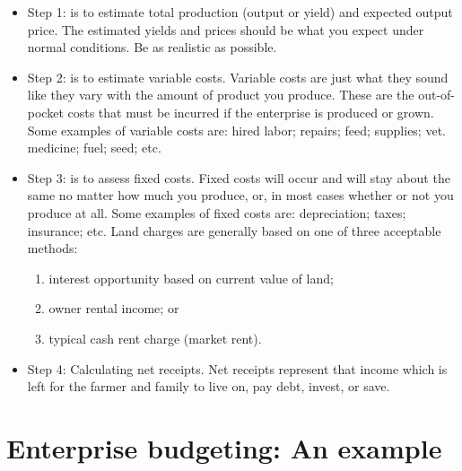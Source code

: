 \documentclass[12pt,ignorenonframetext,aspectratio=169]{beamer}
\providecommand{\tightlist}{%
  \setlength{\itemsep}{0pt}\setlength{\parskip}{0pt}}
\begin{document}
\begin{frame}{}
\protect\hypertarget{section-5}{}
\begin{itemize}
\item
  Step 1: is to estimate total production (output or yield) and expected
  output price. The estimated yields and prices should be what you
  expect under normal conditions. Be as realistic as possible.
\item
  Step 2: is to estimate variable costs. Variable costs are just what
  they sound like they vary with the amount of product you produce.
  These are the out-of- pocket costs that must be incurred if the
  enterprise is produced or grown. Some examples of variable costs are:
  hired labor; repairs; feed; supplies; vet. medicine; fuel; seed; etc.
\end{itemize}
\end{frame}

\begin{frame}{}
\protect\hypertarget{section-6}{}
\begin{itemize}
\tightlist
\item
  Step 3: is to assess fixed costs. Fixed costs will occur and will stay
  about the same no matter how much you produce, or, in most cases
  whether or not you produce at all. Some examples of fixed costs are:
  depreciation; taxes; insurance; etc. Land charges are generally based
  on one of three acceptable methods:

  \begin{enumerate}
  \tightlist
  \item
    interest opportunity based on current value of land;
  \item
    owner rental income; or
  \item
    typical cash rent charge (market rent).
  \end{enumerate}
\item
  Step 4: Calculating net receipts. Net receipts represent that income
  which is left for the farmer and family to live on, pay debt, invest,
  or save.
\end{itemize}
\end{frame}

\hypertarget{enterprise-budgeting-an-example}{%
\section{Enterprise budgeting: An
example}\label{enterprise-budgeting-an-example}}
\end{document}
